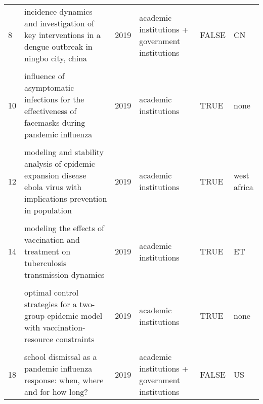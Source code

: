 \documentclass[
]{article}
\begin{document}
\begin{landscape}
\begin{longtable}{l>{\raggedright\arraybackslash}p{4cm}l>{\raggedright\arraybackslash}p{3.5cm}l>{\raggedright\arraybackslash}p{1.5cm}}
8 & incidence dynamics and investigation of key interventions in a dengue outbreak in ningbo city, china & 2019 & academic institutions + government institutions & FALSE & CN\\
\cellcolor{gray!6}{9} & \cellcolor{gray!6}{incorporating media data into a model of infectious disease transmission} & \cellcolor{gray!6}{2019} & \cellcolor{gray!6}{NGO} & \cellcolor{gray!6}{FALSE} & \cellcolor{gray!6}{MX US}\\
10 & influence of asymptomatic infections for the effectiveness of facemasks during pandemic influenza & 2019 & academic institutions & TRUE & none\\
\addlinespace
\cellcolor{gray!6}{11} & \cellcolor{gray!6}{mathematical analysis of a cholera infection model with vaccination strategy} & \cellcolor{gray!6}{2019} & \cellcolor{gray!6}{academic institutions} & \cellcolor{gray!6}{TRUE} & \cellcolor{gray!6}{CN}\\
12 & modeling and stability analysis of epidemic expansion disease ebola virus with implications prevention in population & 2019 & academic institutions & TRUE & west africa\\
\cellcolor{gray!6}{13} & \cellcolor{gray!6}{modeling the effectiveness of respiratory protective devices in reducing influenza outbreak} & \cellcolor{gray!6}{2019} & \cellcolor{gray!6}{academic institutions + government institutions} & \cellcolor{gray!6}{FALSE} & \cellcolor{gray!6}{none}\\
14 & modeling the effects of vaccination and treatment on tuberculosis transmission dynamics & 2019 & academic institutions & TRUE & ET\\
\cellcolor{gray!6}{15} & \cellcolor{gray!6}{optimal control and cost-effective analysis of the 2017 meningitis outbreak in nigeria} & \cellcolor{gray!6}{2019} & \cellcolor{gray!6}{academic institutions} & \cellcolor{gray!6}{TRUE} & \cellcolor{gray!6}{NG}\\
\addlinespace
16 & optimal control strategies for a two-group epidemic model with vaccination-resource constraints & 2019 & academic institutions & TRUE & none\\
\cellcolor{gray!6}{17} & \cellcolor{gray!6}{optimal media reporting intensity on mitigating spread of an emerging infectious disease} & \cellcolor{gray!6}{2019} & \cellcolor{gray!6}{academic institutions} & \cellcolor{gray!6}{TRUE} & \cellcolor{gray!6}{CN}\\
18 & school dismissal as a pandemic influenza response: when, where and for how long? & 2019 & academic institutions + government institutions & FALSE & US\\

\end{longtable}
\end{landscape}
\end{document}
